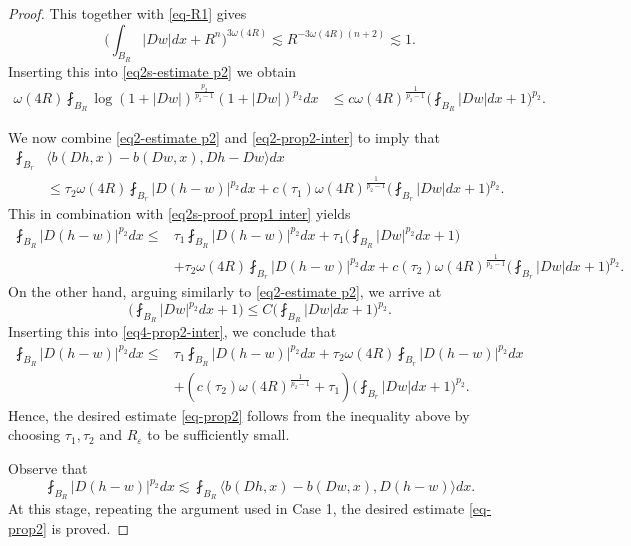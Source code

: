 \documentclass[a4paper,10pt]{amsart}
\newcommand{\lesi}{\lesssim}
\newcommand{\f}{\frac}
\newcommand{\om}{\omega}
\begin{document}
\begin{proof}
	This together with \eqref{eq-R1} gives
	$$
	\Big(\int_{B_{R}}|Dw|dx+R^n\Big)^{3\om(4R)}\lesi R^{-3\om(4R)(n+2)}\lesi 1.
	$$
	Inserting this into \eqref{eq2s-estimate p2} we obtain
	\begin{equation}\label{eq2-estimate p2}
	\begin{aligned}
	\omega(4R)\fint_{B_{R}} \log(1+|Dw|)^{\f{p_2}{p_2-1}}(1+|Dw|)^{p_2}dx
	&\leq c\om(4R)^{\f{1}{p_2-1}}\Big(\fint_{B_{R}}|Dw|dx+1\Big)^{p_2}.
	\end{aligned}
	\end{equation}
	
	We now combine \eqref{eq2-estimate p2} and  \eqref{eq2-prop2-inter} to imply that
	$$
	\begin{aligned}
	\fint_{B_{r}} &\langle b(Dh,x)-b(Dw,x), Dh-Dw \rangle dx\\
	&\leq \tau_2 \om(4R)\fint_{B_{r}}|D(h-w)|^{p_2} dx + c(\tau_1)\om(4R)^{\f{1}{p_2-1}}\Big(\fint_{B_{r}}|Dw|dx+1\Big)^{p_2}.
	\end{aligned}
	$$
	This in combination with \eqref{eq2s-proof prop1 inter} yields
	\begin{equation}\label{eq4-prop2-inter}
	\begin{aligned}
	\fint_{B_{R}}|D(h-w)|^{p_2} dx
	\leq& \tau_1\fint_{B_{R}}|D(h-w)|^{p_2} dx +\tau_1\Big(\fint_{B_{R}}|Dw|^{p_2} dx+1\Big)\\
	&+ \tau_2 \om(4R)\fint_{B_{r}}|D(h-w)|^{p_2} dx+ c(\tau_2)\om(4R)^{\f{1}{p_2-1}}\Big(\fint_{B_{r}}|Dw|dx+1\Big)^{p_2}.
	\end{aligned}
	\end{equation}
	On the other hand, arguing similarly to \eqref{eq2-estimate p2}, we arrive at
	$$
	\Big(\fint_{B_{R}}|Dw|^{p_2} dx+1\Big)\leq C\Big(\fint_{B_{R}}|Dw| dx+1\Big)^{p_2}.
	$$
	Inserting this into \eqref{eq4-prop2-inter}, we conclude that
	$$
	\begin{aligned}
		\fint_{B_{R}}|D(h-w)|^{p_2} dx
		\leq& \tau_1\fint_{B_{R}}|D(h-w)|^{p_2} dx + \tau_2 \om(4R)\fint_{B_{r}}|D(h-w)|^{p_2} dx\\
		&+ (c(\tau_2)\om(4R)^{\f{1}{p_2-1}}+\tau_1)\Big(\fint_{B_{r}}|Dw|dx+1\Big)^{p_2}.
	\end{aligned}
	$$
	Hence, the desired estimate \eqref{eq-prop2} follows from the inequality above by choosing $\tau_1, \tau_2$ and $R_\varepsilon$ to be sufficiently small.
	
	\bigskip
	
	 Observe that 
	$$
	\fint_{B_{R}}|D(h-w)|^{p_2}dx\lesi \fint_{B_{R}} \langle b(Dh,x)-b(Dw,x), D(h-w) \rangle dx.
	$$
	At this stage, repeating the argument used in Case 1, the desired estimate \eqref{eq-prop2} is proved.
\end{proof}
\end{document}
